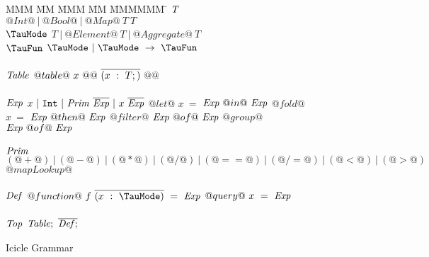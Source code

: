 
\begin{figure}

\begin{tabbing}
MMM \= MM \= MMM \= MM \= MMMMMM \= \kill
$\mathit{T}$
\GrammarDef
  $@Int@~|~@Bool@~|~@Map@~T~T$
\\
$\mi{\TauMode}$
\GrammarDef
  $T~|~@Element@~T~|~@Aggregate@~T$
\\
$\mi{\TauFun}$
\GrammarDef
  $\TauMode ~|~ \TauMode~\to~\TauFun$
\\
\\

$\mathit{Table}$
\GrammarDef
  $@table@~x~@{@~\overline{(x~:~T;)}~@}@$
\\
\\

$\mathit{Exp}$
\GrammarDef
  $x~|~\mathtt{Int}~|~\mathit{Prim}~\overline{\mathit{Exp}}~|~x~\overline{\mathit{Exp}}$
\GrammarAlt
  $@let@$   \> $x~=$ \> $\mathit{Exp}~@  in@~\mathit{Exp}$
\GrammarAlt
  $@fold@$  \> $x~=$ \> $\mathit{Exp}~@then@~\mathit{Exp}$
\GrammarAlt
  $@filter@$\> \> $\mathit{Exp}~@  of@~\mathit{Exp}$
\GrammarAlt
  $@group@$ \> \> $\mathit{Exp}~@  of@~\mathit{Exp}$
\\
\\

$\mathit{Prim}$
\GrammarDef
  $(@+@)~|~(@-@)~|~(@*@)~|~(@/@)~|~(@==@)~|~(@/=@)~|~(@<@)~|~(@>@)$
\GrammarAlt
  $@mapLookup@$
\\
\\


$\mathit{Def}$
\GrammarDef
  $@function@~f~\ov{(x~:~\TauMode)}~=~\mi{Exp}$
\GrammarAlt
  $@query@~x~=~\mathit{Exp}$
\\
\\
$\mathit{Top}$
\GrammarDef
  $\mathit{Table};~\overline{\mathit{Def};}$
\end{tabbing}

\caption{Icicle Grammar}
\label{fig:source:grammar}
\end{figure}


